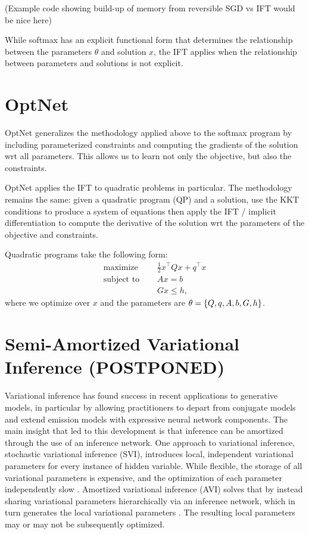 \documentclass[11pt]{article}
\begin{document}
(Example code showing build-up of memory from reversible SGD vs IFT would be nice here)

While softmax has an explicit functional form that determines the relationship between
the parameters $\theta$ and solution $x$, the IFT applies when
the relationship between parameters and solutions is not explicit.

\section{OptNet}
OptNet generalizes the methodology applied above to the softmax program by
including parameterized constraints and computing the gradients of the solution
wrt all parameters.
This allows us to learn not only the objective, but also the constraints.

OptNet applies the IFT to quadratic problems in particular.
The methodology remains the same: given a quadratic program (QP) and a solution,
use the KKT conditions to produce a system of equations then apply the IFT
/ implicit differentiation to compute the derivative of the solution wrt the
parameters of the objective and constraints.

Quadratic programs take the following form:
\begin{equation}
\label{eqn:qp}
\begin{aligned}
\textrm{maximize } \quad & \frac12 x^\top Q x + q^\top x\\
\textrm{subject to } \quad & Ax = b\\
& Gx \leq h,
\end{aligned}
\end{equation}
where we optimize over $x$ and the parameters are $\theta = \left\{Q, q, A, b, G, h\right\}$.

\section{Semi-Amortized Variational Inference (POSTPONED)}
Variational inference has found success in recent applications to generative models,
in particular by allowing practitioners to depart from conjugate models
and extend emission models with expressive neural network components.
The main insight that led to this development is that inference can be amortized through
the use of an inference network.
One approach to variational inference, stochastic variational inference (SVI),
introduces local, independent variational parameters for every instance of hidden variable.
While flexible, the storage of all variational parameters is expensive, and the optimization
of each parameter independently slow \citep{}.
Amortized variational inference (AVI) solves that by instead sharing variational parameters hierarchically
via an inference network, which in turn generates the local variational parameters \citep{}.
The resulting local parameters may or may not be subsequently optimized.
\end{document}
